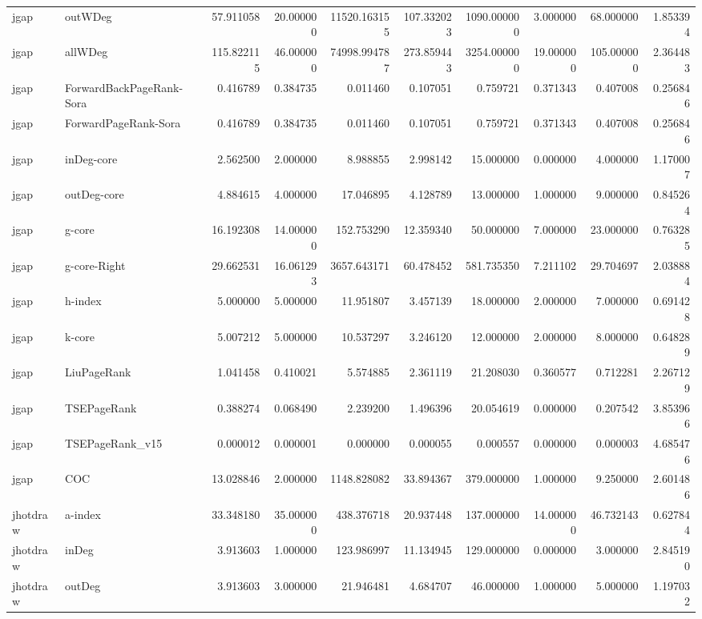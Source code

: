 \begin{tabular}{llrrrrrrrr}
jgap & outWDeg & 57.911058 & 20.000000 & 11520.163155 & 107.332023 & 1090.000000 & 3.000000 & 68.000000 & 1.853394 \\
jgap & allWDeg & 115.822115 & 46.000000 & 74998.994787 & 273.859443 & 3254.000000 & 19.000000 & 105.000000 & 2.364483 \\
jgap & ForwardBackPageRank-Sora & 0.416789 & 0.384735 & 0.011460 & 0.107051 & 0.759721 & 0.371343 & 0.407008 & 0.256846 \\
jgap & ForwardPageRank-Sora & 0.416789 & 0.384735 & 0.011460 & 0.107051 & 0.759721 & 0.371343 & 0.407008 & 0.256846 \\
jgap & inDeg-core & 2.562500 & 2.000000 & 8.988855 & 2.998142 & 15.000000 & 0.000000 & 4.000000 & 1.170007 \\
jgap & outDeg-core & 4.884615 & 4.000000 & 17.046895 & 4.128789 & 13.000000 & 1.000000 & 9.000000 & 0.845264 \\
jgap & g-core & 16.192308 & 14.000000 & 152.753290 & 12.359340 & 50.000000 & 7.000000 & 23.000000 & 0.763285 \\
jgap & g-core-Right & 29.662531 & 16.061293 & 3657.643171 & 60.478452 & 581.735350 & 7.211102 & 29.704697 & 2.038884 \\
jgap & h-index & 5.000000 & 5.000000 & 11.951807 & 3.457139 & 18.000000 & 2.000000 & 7.000000 & 0.691428 \\
jgap & k-core & 5.007212 & 5.000000 & 10.537297 & 3.246120 & 12.000000 & 2.000000 & 8.000000 & 0.648289 \\
jgap & LiuPageRank & 1.041458 & 0.410021 & 5.574885 & 2.361119 & 21.208030 & 0.360577 & 0.712281 & 2.267129 \\
jgap & TSEPageRank & 0.388274 & 0.068490 & 2.239200 & 1.496396 & 20.054619 & 0.000000 & 0.207542 & 3.853966 \\
jgap & TSEPageRank_v15 & 0.000012 & 0.000001 & 0.000000 & 0.000055 & 0.000557 & 0.000000 & 0.000003 & 4.685476 \\
jgap & COC & 13.028846 & 2.000000 & 1148.828082 & 33.894367 & 379.000000 & 1.000000 & 9.250000 & 2.601486 \\
jhotdraw & a-index & 33.348180 & 35.000000 & 438.376718 & 20.937448 & 137.000000 & 14.000000 & 46.732143 & 0.627844 \\
jhotdraw & inDeg & 3.913603 & 1.000000 & 123.986997 & 11.134945 & 129.000000 & 0.000000 & 3.000000 & 2.845190 \\
jhotdraw & outDeg & 3.913603 & 3.000000 & 21.946481 & 4.684707 & 46.000000 & 1.000000 & 5.000000 & 1.197032 \\

\end{tabular}
